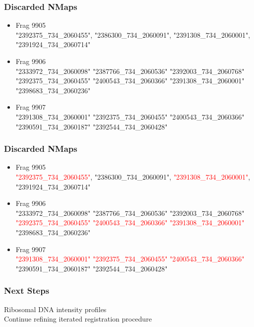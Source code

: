 \documentclass[10pt,dvipsnames,table]{beamer}
\begin{document}
\begin{frame}
\frametitle{Discarded NMaps}
\begin{itemize}
\item Frag 9905 \\
"2392375\_734\_2060455", "2386300\_734\_2060091", "2391308\_734\_2060001", "2391924\_734\_2060714"
\item Frag 9906 \\
"2333972\_734\_2060098" "2387766\_734\_2060536" "2392003\_734\_2060768" "2392375\_734\_2060455"
"2400543\_734\_2060366" "2391308\_734\_2060001" "2398683\_734\_2060236"
\item Frag 9907 \\
"2391308\_734\_2060001" "2392375\_734\_2060455" "2400543\_734\_2060366" "2390591\_734\_2060187"
"2392544\_734\_2060428"
\end{itemize}
\end{frame}

\begin{frame}
\frametitle{Discarded NMaps}
\begin{itemize}
\item Frag 9905 \\
\textcolor{red}{"2392375\_734\_2060455"}, "2386300\_734\_2060091", 
\textcolor{red}{"2391308\_734\_2060001"}, "2391924\_734\_2060714"
\item Frag 9906 \\
"2333972\_734\_2060098" "2387766\_734\_2060536" "2392003\_734\_2060768" 
\textcolor{red}{"2392375\_734\_2060455"}
\textcolor{red}{"2400543\_734\_2060366"} \textcolor{red}{"2391308\_734\_2060001"} "2398683\_734\_2060236"
\item Frag 9907 \\
\textcolor{red}{"2391308\_734\_2060001"} \textcolor{red}{"2392375\_734\_2060455"} \textcolor{red}{"2400543\_734\_2060366"} "2390591\_734\_2060187"
"2392544\_734\_2060428"
\end{itemize}
\end{frame}

\begin{frame}
\frametitle{Next Steps}
Ribosomal DNA intensity profiles\\
Continue refining iterated registration procedure\\

\end{frame}
\end{document}
